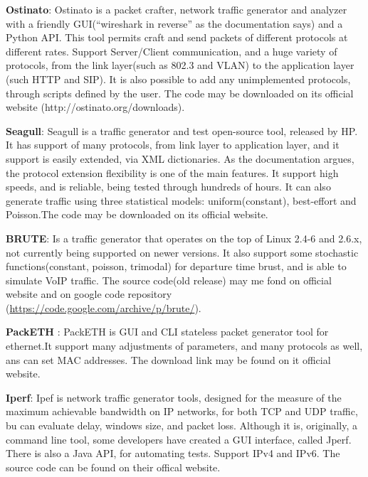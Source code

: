 \textbf{Ostinato}\cite{web-ostinato}: Ostinato is a packet crafter, network traffic generator and analyzer with a friendly GUI(“wireshark in reverse” as the documentation says) and a Python API. This tool permits craft and send packets of different protocols  at different rates. Support Server/Client communication, and a huge variety of protocols, from the link layer(such as 802.3 and VLAN) to the application layer (such HTTP and SIP). It is also possible to add any unimplemented protocols, through scripts defined by the user. The code may be downloaded on its official website (http://ostinato.org/downloads).


\textbf{Seagull}\cite{wp-seagull}\cite{web-seagull}: Seagull is a traffic generator and test open-source tool, released by HP. It has support of many protocols, from link layer to application layer, and it support is easily extended, via XML dictionaries. As the documentation argues, the protocol extension flexibility is one of the main features. It support high speeds, and is reliable, being tested through hundreds of hours. It can also generate traffic using three statistical models: uniform(constant), best-effort and Poisson.The code may be downloaded on its official website.


\textbf{BRUTE}\cite{web-brute}: Is a traffic generator that operates on the top of  Linux 2.4-6 and 2.6.x, not currently being supported on newer versions. It also support some stochastic functions(constant, poisson, trimodal) for departure time brust, and is able to simulate VoIP traffic. The source code(old release) may me fond on official website and on google code repository (\href{https://code.google.com/archive/p/brute/}{https://code.google.com/archive/p/brute/}).


\textbf{PackETH} \cite{web-packeth}: PackETH is GUI and CLI stateless packet generator tool for ethernet.It support many adjustments of parameters, and many protocols as well, ans can set MAC addresses. The download link may be found on it official website.


\textbf{Iperf}\cite{web-iperf}: Ipef is network traffic generator tools, designed for the measure of the maximum achievable bandwidth on IP networks, for both TCP and UDP traffic, bu can evaluate delay, windows size, and packet loss.  Although it is, originally, a command line tool, some developers have created a GUI interface, called Jperf\cite{web-jperf}. There is also a Java API, for automating tests\cite{jperf-git}. Support IPv4 and IPv6. The source code can be found on their offical website.


